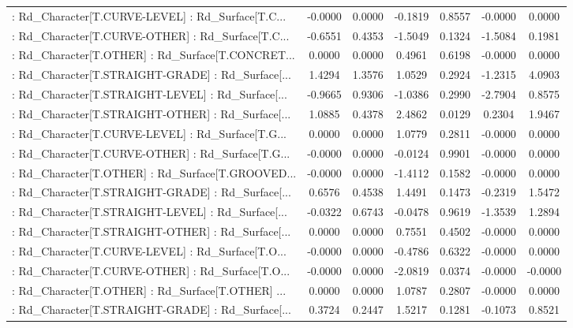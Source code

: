 \begin{longtable}{p{4cm}cccccc}
 : Rd\_Character[T.CURVE-LEVEL] : Rd\_Surface[T.C... & -0.0000 &    0.0000 & -0.1819 &       0.8557 & -0.0000 &  0.0000 \\
 : Rd\_Character[T.CURVE-OTHER] : Rd\_Surface[T.C... & -0.6551 &    0.4353 & -1.5049 &       0.1324 & -1.5084 &  0.1981 \\
 : Rd\_Character[T.OTHER] : Rd\_Surface[T.CONCRET... &  0.0000 &    0.0000 &  0.4961 &       0.6198 & -0.0000 &  0.0000 \\
 : Rd\_Character[T.STRAIGHT-GRADE] : Rd\_Surface[... &  1.4294 &    1.3576 &  1.0529 &       0.2924 & -1.2315 &  4.0903 \\
 : Rd\_Character[T.STRAIGHT-LEVEL] : Rd\_Surface[... & -0.9665 &    0.9306 & -1.0386 &       0.2990 & -2.7904 &  0.8575 \\
 : Rd\_Character[T.STRAIGHT-OTHER] : Rd\_Surface[... &  1.0885 &    0.4378 &  2.4862 &       0.0129 &  0.2304 &  1.9467 \\
 : Rd\_Character[T.CURVE-LEVEL] : Rd\_Surface[T.G... &  0.0000 &    0.0000 &  1.0779 &       0.2811 & -0.0000 &  0.0000 \\
 : Rd\_Character[T.CURVE-OTHER] : Rd\_Surface[T.G... & -0.0000 &    0.0000 & -0.0124 &       0.9901 & -0.0000 &  0.0000 \\
 : Rd\_Character[T.OTHER] : Rd\_Surface[T.GROOVED... & -0.0000 &    0.0000 & -1.4112 &       0.1582 & -0.0000 &  0.0000 \\
 : Rd\_Character[T.STRAIGHT-GRADE] : Rd\_Surface[... &  0.6576 &    0.4538 &  1.4491 &       0.1473 & -0.2319 &  1.5472 \\
 : Rd\_Character[T.STRAIGHT-LEVEL] : Rd\_Surface[... & -0.0322 &    0.6743 & -0.0478 &       0.9619 & -1.3539 &  1.2894 \\
 : Rd\_Character[T.STRAIGHT-OTHER] : Rd\_Surface[... &  0.0000 &    0.0000 &  0.7551 &       0.4502 & -0.0000 &  0.0000 \\
 : Rd\_Character[T.CURVE-LEVEL] : Rd\_Surface[T.O... & -0.0000 &    0.0000 & -0.4786 &       0.6322 & -0.0000 &  0.0000 \\
 : Rd\_Character[T.CURVE-OTHER] : Rd\_Surface[T.O... & -0.0000 &    0.0000 & -2.0819 &       0.0374 & -0.0000 & -0.0000 \\
 : Rd\_Character[T.OTHER] : Rd\_Surface[T.OTHER] ... &  0.0000 &    0.0000 &  1.0787 &       0.2807 & -0.0000 &  0.0000 \\
 : Rd\_Character[T.STRAIGHT-GRADE] : Rd\_Surface[... &  0.3724 &    0.2447 &  1.5217 &       0.1281 & -0.1073 &  0.8521 \\

\end{longtable}
